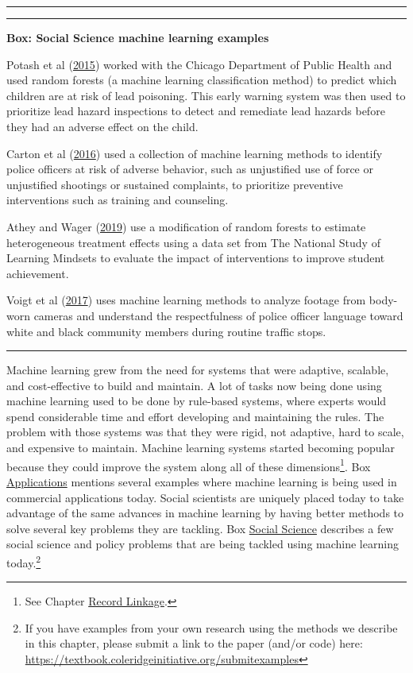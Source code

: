 \documentclass[]{krantz}
\begin{document}
\begin{center}\rule{0.5\linewidth}{\linethickness}\end{center}

\begin{center}\rule{0.5\linewidth}{\linethickness}\end{center}

\textbf{Box: Social Science machine learning examples}

Potash et al (\protect\hyperlink{ref-Potash2015}{2015}) worked with the
Chicago Department of Public Health and used random forests (a machine
learning classification method) to predict which children are at risk of
lead poisoning. This early warning system was then used to prioritize
lead hazard inspections to detect and remediate lead hazards before they
had an adverse effect on the child.

Carton et al (\protect\hyperlink{ref-Carton2016}{2016}) used a
collection of machine learning methods to identify police officers at
risk of adverse behavior, such as unjustified use of force or
unjustified shootings or sustained complaints, to prioritize preventive
interventions such as training and counseling.

Athey and Wager (\protect\hyperlink{ref-athey2019}{2019}) use a
modification of random forests to estimate heterogeneous treatment
effects using a data set from The National Study of Learning Mindsets to
evaluate the impact of interventions to improve student achievement.

Voigt et al (\protect\hyperlink{ref-Voigt2017}{2017}) uses machine
learning methods to analyze footage from body-worn cameras and
understand the respectfulness of police officer language toward white
and black community members during routine traffic stops.

\begin{center}\rule{0.5\linewidth}{\linethickness}\end{center}

Machine learning grew from the need for systems that were adaptive,
scalable, and cost-effective to build and maintain. A lot of tasks now
being done using machine learning used to be done by rule-based systems,
where experts would spend considerable time and effort developing and
maintaining the rules. The problem with those systems was that they were
rigid, not adaptive, hard to scale, and expensive to maintain. Machine
learning systems started becoming popular because they could improve the
system along all of these dimensions\footnote{See Chapter
  \protect\hyperlink{chap:link}{Record Linkage}.}. Box
\protect\hyperlink{box:ml1}{Applications} mentions several examples
where machine learning is being used in commercial applications today.
Social scientists are uniquely placed today to take advantage of the
same advances in machine learning by having better methods to solve
several key problems they are tackling. Box
\protect\hyperlink{box:ml2}{Social Science} describes a few social
science and policy problems that are being tackled using machine
learning today.\footnote{If you have examples from your own research
  using the methods we describe in this chapter, please submit a link to
  the paper (and/or code) here:
  \url{https://textbook.coleridgeinitiative.org/submitexamples}}
\end{document}
